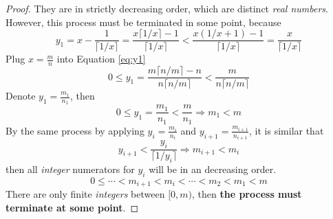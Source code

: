 \documentclass[a4paper,12pt]{article}
\theoremstyle{definition}
\newenvironment{problems}{\begin{list}{}{\renewcommand{\makelabel}[1]{\textbf{##1}\hfil}}}{\end{list}}
\begin{document}
\begin{problems}
\begin{proof}
        They are in strictly decreasing order, which are distinct \emph{real numbers}.
        However, this process must be terminated in some point, because
        \begin{equation}\label{eq:y1}
            y_1 = x - \frac{1}{\lceil 1/x \rceil} = \frac{x\lceil 1/x \rceil - 1}{\lceil 1/x \rceil} <\frac{x(1/x+1)-1}{\lceil 1/x \rceil} = \frac{x}{\lceil 1/x \rceil}
        \end{equation}
        Plug $x = \frac{m}{n}$ into Equation \eqref{eq:y1}
        \begin{equation*}
            0\leq y_1=\frac{m\lceil n/m \rceil - n}{n\lceil n/m \rceil}<\frac{m}{n\lceil n/m \rceil}
        \end{equation*}
        Denote $y_1=\frac{m_1}{n_1}$, then
        \begin{equation*}
            0\leq y_1 = \frac{m_1}{n_1} < \frac{m}{n_1} \Rightarrow m_1 < m
        \end{equation*}
        By the same process by applying $y_i = \frac{m_i}{n_i}$ and $y_{i+1}=\frac{m_{i+1}}{n_{i+1}}$, it is similar that 
        \begin{equation*}
            y_{i+1} < \frac{y_i}{\lceil 1/y_i \rceil} \Rightarrow m_{i+1} < m_i
        \end{equation*}
        then all \emph{integer} numerators for $y_i$ will be in an decreasing order.
        \begin{equation}
            0\leq \cdots < m_{i+1}<m_i < \cdots < m_2 < m_1 <m
        \end{equation}
        There are only finite \emph{integers} between $[0,m)$, then \textbf{the process must terminate at some point}.


\end{proof}
\end{problems}
\end{document}
